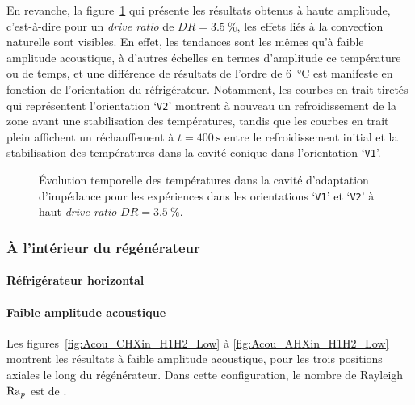 En revanche, la figure~\ref{fig:Acou_CHXout_V1V2_High} qui présente les résultats obtenus à haute amplitude, c'est-à-dire pour un \textit{drive ratio} de $DR=\qty{3.5}{\percent}$, les effets liés à la convection naturelle sont visibles. En effet, les tendances sont les mêmes qu'à faible amplitude acoustique, à d'autres échelles en termes d'amplitude ce température ou de temps, et une différence de résultats de l'ordre de \qty{6}{\degreeCelsius} est manifeste en fonction de l'orientation du réfrigérateur. Notamment, les courbes en trait tiretés qui représentent l'orientation `\texttt{V2}' montrent à nouveau un refroidissement de la zone avant une stabilisation des températures, tandis que les courbes en trait plein affichent un réchauffement à $t=\qty{400}{\second}$ entre le refroidissement initial et la stabilisation des températures dans la cavité conique dans l'orientation `\texttt{V1}'.

\begin{figure}[!ht]
    \centering
    
    \caption{\'Evolution temporelle des températures dans la cavité d'adaptation d'impédance pour les expériences dans les orientations `\texttt{V1}' et `\texttt{V2}' à haut \textit{drive ratio} $DR=\qty{3.5}{\percent}$.}
    \label{fig:Acou_CHXout_V1V2_High}
\end{figure}



\subsubsection{À l'intérieur du régénérateur}
\paragraph{Réfrigérateur horizontal}
\paragraph*{Faible amplitude acoustique}
Les figures~\ref{fig:Acou_CHXin_H1H2_Low} à \ref{fig:Acou_AHXin_H1H2_Low} montrent les résultats à faible amplitude acoustique, pour les trois positions axiales le long du régénérateur. Dans cette configuration, le nombre de Rayleigh $\mathrm{Ra}_p$ est de . 

